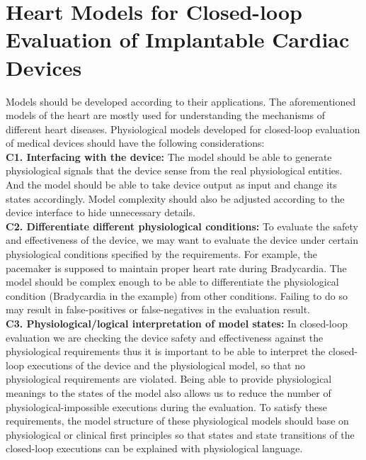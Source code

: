 \section{Heart Models for Closed-loop Evaluation of Implantable Cardiac Devices}
Models should be developed according to their applications. The aforementioned models of the heart are mostly used for understanding the mechanisms of different heart diseases. Physiological models developed for closed-loop evaluation of medical devices should have the following considerations:\\
\textbf{C1. Interfacing with the device: }The model should be able to generate physiological signals that the device sense from the real physiological entities. And the model should be able to take device output as input and change its states accordingly. Model complexity should also be adjusted according to the device interface to hide unnecessary details.\\
\textbf{C2. Differentiate different physiological conditions: }To evaluate the safety and effectiveness of the device, we may want to evaluate the device under certain physiological conditions specified by the requirements. For example, the pacemaker is supposed to maintain proper heart rate during Bradycardia. The model should be complex enough to be able to differentiate the physiological condition (Bradycardia in the example) from other conditions. Failing to do so may result in false-positives or false-negatives in the evaluation result. \\
\textbf{C3. Physiological/logical interpretation of model states: } In closed-loop evaluation we are checking the device safety and effectiveness against the physiological requirements thus it is important to be able to interpret the closed-loop executions of the device and the physiological model, so that no physiological requirements are violated. Being able to provide physiological meanings to the states of the model also allows us to reduce the number of physiological-impossible executions during the evaluation. To satisfy these requirements, the model structure of these physiological models should base on physiological or clinical first principles so that states and state transitions of the closed-loop executions can be explained with physiological language. \\%
